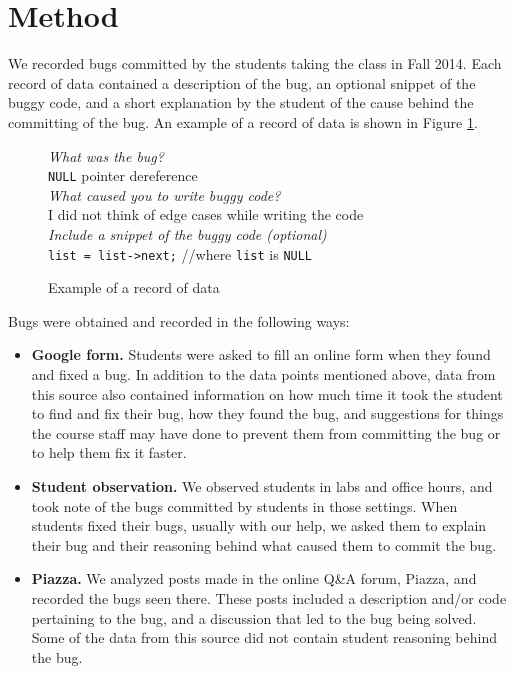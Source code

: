 \documentclass{sig-alternate}
\begin{document}
\section{Method}
\label{sec:method}

We recorded bugs committed by the students taking the class in Fall
2014. Each record of data contained a description of the bug, an
optional snippet of the buggy code, and a short explanation by the
student of the cause behind the committing of the bug. An example of a
record of data is shown in Figure \ref{fig:record}.\\

\begin{figure}
\begin{framed}
\emph{What was the bug?}\\
\verb|NULL| pointer dereference\\

\emph{What caused you to write buggy code?}\\
 I did not think of edge cases while writing the code\\

\emph{Include a snippet of the buggy code (optional)}\\
\verb|list = list->next;| //where \verb|list| is \verb|NULL|
\end{framed}
\vspace{-0.1in}
\caption{Example of a record of data}
\label{fig:record}
\end{figure}

Bugs were obtained and recorded in the following ways:
\begin{itemize}

\item{\textbf{Google form.} Students were asked to fill an online form
when they found and fixed a bug. In addition to the data points
mentioned above, data from this source also contained information on
how much time it took the student to find and fix their bug, how they
found the bug, and suggestions for things the course staff may have
done to prevent them from committing the bug or to help them fix it
faster.}

\item{\textbf{Student observation.} We observed students in labs and
office hours, and took note of the bugs committed by students in those
settings. When students fixed their bugs, usually with our help, we
asked them to explain their bug and their reasoning behind what caused
them to commit the bug.}

\item{\textbf{Piazza.} We analyzed posts made in the online Q\&A
forum, Piazza, and recorded the bugs seen there. These posts included
a description and/or code pertaining to the bug, and a discussion that
led to the bug being solved. Some of the data from this source did not
contain student reasoning behind the bug.}

\end{itemize}
\end{document}
